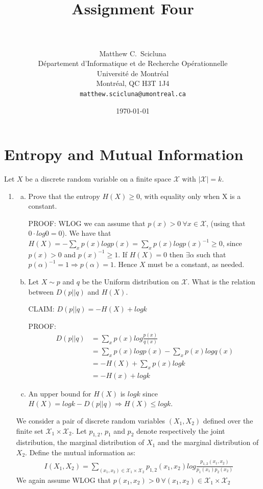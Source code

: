 \documentclass[paper=a4, fontsize=11pt]{scrartcl} %
\title{	
\normalfont \normalsize 
\horrule{0.5pt} \\[0.4cm] %
\huge Assignment Four \\ %
\horrule{2pt} \\[0.5cm] %
}
\author{
	Matthew C.~Scicluna\\
	D\'epartement d'Informatique et de Recherche Op\'erationnelle\\
	Universit\'e de Montr\'eal\\
	Montr\'eal, QC H3T 1J4 \\
	\texttt{matthew.scicluna@umontreal.ca}
}
\date{\normalsize\today} %
\numberwithin{equation}{section} %
\numberwithin{figure}{section} %
\numberwithin{table}{section} %
\begin{document}
\maketitle %


\section{Entropy and Mutual Information}
	Let \(X\) be a discrete random variable on a finite space \(\mathcal{X}\) with \(|\mathcal{X}| = k\).
\begin{enumerate} 
	\item\begin{enumerate}[(a)]
		\item Prove that the entropy \(H(X)\ge0\), with equality only when X is a constant.
		
		PROOF: WLOG we can assume that \(p(x)>0 \ \forall x\in\mathcal{X}\), (using that \(0\cdot log0 = 0\)). We have that \(H(X) = -\sum_{x} p(x)logp(x) = \sum_{x} p(x)logp(x)^{-1}\ge0\), since \(p(x)>0\) and \(p(x)^{-1} \ge 1\). If \(H(X)=0\) then \(\exists \alpha\) such that \(p(\alpha)^{-1}=1 \Rightarrow p(\alpha)=1\). Hence \(X\) must be a constant, as needed.
		\item Let \(X \sim p\) and \(q\) be the Uniform distribution on \(\mathcal{X}\). What is the relation between \(D(p||q)\) and \(H(X)\).
		
		CLAIM: \(D(p||q) = -H(X) + logk\)
		
		PROOF: 
		\begin{align*}
		D(p||q)&=\sum_{x}p(x)log\frac{p(x)}{q(x)}\\
		&=\sum_{x}p(x)logp(x)-\sum_xp(x)logq(x)\\
		&= -H(X) + \sum_xp(x)logk \\
		&= -H(x) + logk
		\end{align*}
		\item An upper bound for \(H(X)\) is \(logk\) since \(H(X)=logk-D(p||q) \Rightarrow H(X) \le logk \).
		\end{enumerate}
		We consider a pair of discrete random variables \((X_1,X_2)\) defined over the finite set \(\mathcal{X}_1\times\mathcal{X}_2\).
		Let \(p_{1,2}\), \(p_1\) and \(p_2\) denote respectively the joint distribution, the marginal distribution of \(X_1\) and the marginal distribution of \(X_2\). Define the mutual information as:
		\begin{align*}
		I(X_1,X_2)=\sum_{(x_1,x_2)\in\mathcal{X}_1\times\mathcal{X}_2}p_{1,2}(x_1,x_2)log\frac{p_{1,2}(x_1,x_2)}{p_1(x_1)p_2(x_2)}
		\end{align*}
		We again assume WLOG that \(p(x_1,x_2)>0 \ \forall (x_1,x_2)\in\mathcal{X}_1\times\mathcal{X}_2\)
		

\end{enumerate}
\end{document}

